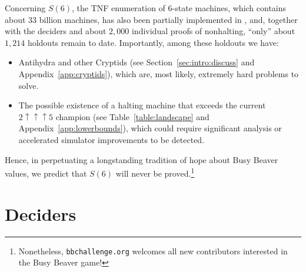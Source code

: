 \documentclass[a4paper,british]{article}
\theoremstyle{definition} %
\numberwithin{equation}{section}
\theoremstyle{definition} %
\newcommand{\numBBsholdouts}{1{,}214}
\newcommand{\rado}{Rad\'o\xspace}
\begin{document}
Concerning $S(6)$, the TNF enumeration of 6-state machines, which contains about 33 billion machines, has also been partially implemented in \Coq, and, together with the deciders and about $2{,}000$ individual proofs of nonhalting, ``only'' about $\numBBsholdouts$ holdouts remain to date. Importantly, among these holdouts we have:
\begin{itemize}[label=--]
    \item Antihydra and other Cryptids (see Section~\ref{sec:intro:discuss} and Appendix~\ref{app:cryptids}), which are, most likely, extremely hard problems to solve.
    \item The possible existence of a halting machine that exceeds the current $2\uparrow\uparrow\uparrow5$ champion (see Table~\ref{table:landscape} and Appendix~\ref{app:lowerbounds}), which could require significant analysis or accelerated simulator improvements to be detected.
\end{itemize}


Hence, in perpetuating a longstanding tradition of hope about Busy Beaver values, we predict that $S(6)$ will never be proved.\footnote{Nonetheless, \texttt{bbchallenge.org} welcomes all new contributors interested in the Busy Beaver game!}




\newpage



\section{Deciders}\label{sec:deciders}
\end{document}
